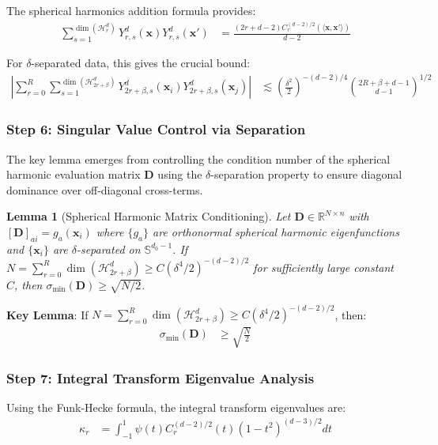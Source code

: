 \documentclass{article}
\newtheorem{lemma}[theorem]{Lemma}
\newcommand{\x}{\mathbf{x}}
\begin{document}
The spherical harmonics addition formula provides:
\begin{align}
    \sum_{s=1}^{\dim(\mathcal{H}_r^d)} Y_{r,s}^d(\x) Y_{r,s}^d(\x') &= \frac{(2r + d - 2)C_r^{(d-2)/2}(\langle \x, \x' \rangle)}{d - 2}
\end{align}

For $\delta$-separated data, this gives the crucial bound:
\begin{align}
    \left|\sum_{r=0}^R \sum_{s=1}^{\dim(\mathcal{H}_{2r+\beta}^d)} Y_{2r+\beta,s}^d(\x_i) Y_{2r+\beta,s}^d(\x_j)\right| &\lesssim \left(\frac{\delta^2}{2}\right)^{-(d-2)/4} \binom{2R + \beta + d - 1}{d - 1}^{1/2}
\end{align}

\subsubsection{Step 6: Singular Value Control via Separation}

The key lemma emerges from controlling the condition number of the spherical harmonic evaluation matrix $\mathbf{D}$ using the $\delta$-separation property to ensure diagonal dominance over off-diagonal cross-terms.

\begin{lemma}[Spherical Harmonic Matrix Conditioning]
Let $\mathbf{D} \in \mathbb{R}^{N \times n}$ with $[\mathbf{D}]_{ai} = g_a(\x_i)$ where $\{g_a\}$ are orthonormal spherical harmonic eigenfunctions and $\{\x_i\}$ are $\delta$-separated on $\mathbb{S}^{d_0-1}$. If $N = \sum_{r=0}^R \dim(\mathcal{H}_{2r+\beta}^d) \geq C(\delta^4/2)^{-(d-2)/2}$ for sufficiently large constant $C$, then $\sigma_{\min}(\mathbf{D}) \geq \sqrt{N/2}$.
\end{lemma}

\textbf{Key Lemma}: If $N = \sum_{r=0}^R \dim(\mathcal{H}_{2r+\beta}^d) \geq C(\delta^4/2)^{-(d-2)/2}$, then:
\begin{align}
    \sigma_{\min}(\mathbf{D}) &\geq \sqrt{\frac{N}{2}}
\end{align}

\subsubsection{Step 7: Integral Transform Eigenvalue Analysis}

Using the Funk-Hecke formula, the integral transform eigenvalues are:
\begin{align}
    \kappa_r &= \int_{-1}^1 \psi(t) C_r^{(d-2)/2}(t) (1-t^2)^{(d-3)/2} dt
\end{align}
\end{document}
